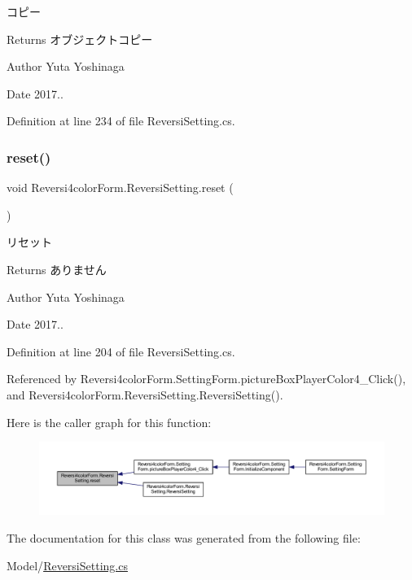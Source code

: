 コピー 

\begin{DoxyReturn}{Returns}
オブジェクトコピー 
\end{DoxyReturn}
\begin{DoxyAuthor}{Author}
Yuta Yoshinaga 
\end{DoxyAuthor}
\begin{DoxyDate}{Date}
2017.. 
\end{DoxyDate}


Definition at line 234 of file Reversi\+Setting.\+cs.

\mbox{\label{class_reversi4color_form_1_1_reversi_setting_abbcc5e30dfee6da2c6e46929fd64dd1f}} 
\subsubsection{\texorpdfstring{reset()}{reset()}}
{\footnotesize\ttfamily void Reversi4color\+Form.\+Reversi\+Setting.\+reset (\begin{DoxyParamCaption}{ }\end{DoxyParamCaption})}



リセット 

\begin{DoxyReturn}{Returns}
ありません 
\end{DoxyReturn}
\begin{DoxyAuthor}{Author}
Yuta Yoshinaga 
\end{DoxyAuthor}
\begin{DoxyDate}{Date}
2017.. 
\end{DoxyDate}


Definition at line 204 of file Reversi\+Setting.\+cs.



Referenced by Reversi4color\+Form.\+Setting\+Form.\+picture\+Box\+Player\+Color4\+\_\+\+Click(), and Reversi4color\+Form.\+Reversi\+Setting.\+Reversi\+Setting().

Here is the caller graph for this function\+:
\nopagebreak
\begin{figure}[H]
\begin{center}
\leavevmode
\includegraphics[width=350pt]{class_reversi4color_form_1_1_reversi_setting_abbcc5e30dfee6da2c6e46929fd64dd1f_icgraph}
\end{center}
\end{figure}


The documentation for this class was generated from the following file\+:\begin{DoxyCompactItemize}
\item 
Model/\hyperlink{_reversi_setting_8cs}{Reversi\+Setting.\+cs}\end{DoxyCompactItemize}
